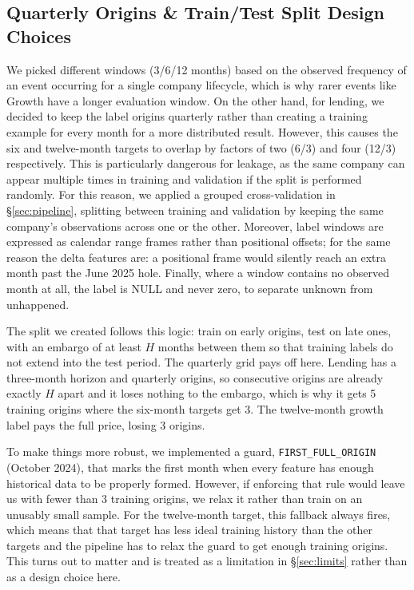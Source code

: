 \documentclass[    author={Samuel Menon Demelo; Sneha Saphala Ram Prasad; 
Viktor Ander Lindholm; Vishal Khatri},
               supervisor={Prof. Fernando Moreno-Pino},
                   degree={MSc},
                    title={Lloyds Commercial Banking Intelligence},
                 subtitle={Ranking SME Lending, Risk and Growth Prospects for Lloyds Banking Group},
                     type={},
                     year={2026}]{dissertation}
\begin{document}
\subsection{Quarterly Origins \& Train/Test Split Design Choices}
\label{sec:train-test-split-logic}
We picked different windows (3/6/12 months) based on the observed frequency of an event occurring for a single company lifecycle, which is why rarer events like Growth have a longer evaluation window. On the other hand, for lending, we decided to keep the label origins quarterly rather than creating a training example for every month for a more distributed result. However, this causes the six and twelve-month targets to overlap by factors of two (6/3) and four (12/3) respectively. This is particularly dangerous for leakage, as the same company can appear multiple times in training and validation if the split is performed randomly. For this reason, we applied a grouped cross-validation in \S\ref{sec:pipeline}, splitting between training and validation by keeping the same company's observations across one or the other. Moreover, label windows are expressed as calendar range frames rather than positional offsets; for the same reason the delta features are: a positional frame would silently reach an extra month past the June 2025 hole. Finally, where a window contains no observed month at all, the label is NULL and never zero, to separate unknown from unhappened.

The split we created follows this logic: train on early origins, test on late ones, with an embargo of at least $H$ months between them so that training labels do not extend into the test period. The quarterly grid pays off here. Lending has a three-month horizon and quarterly origins, so consecutive origins are already exactly $H$ apart and it loses nothing to the embargo, which is why it gets 5 training origins where the six-month targets get 3. The twelve-month growth label pays the full price, losing 3 origins. 

To make things more robust, we implemented a guard, \texttt{FIRST\_FULL\_ORIGIN} (October 2024), that marks the first month when every feature has enough historical data to be properly formed. However, if enforcing that rule would leave us with fewer than 3 training origins, we relax it rather than train on an unusably small sample. For the twelve-month target, this fallback always fires, which means that that target has less ideal training history than the other targets and the pipeline has to relax the guard to get enough training origins. This turns out to matter and is treated as a limitation in \S\ref{sec:limits} rather than as a design choice here.
\end{document}
